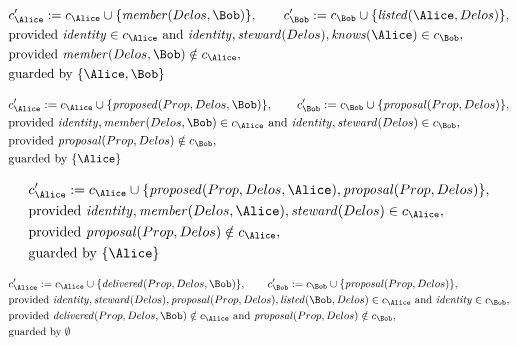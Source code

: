 \begin{align*}
&
c'_
{
\Alice
}
 := 
c_
{
\Alice
}
 \cup 
\{
\mathit{\detokenize{
member
}}
(
Delos
,
\Bob
)
\}
, \qquad 
c'_
{
\Bob
}
 := 
c_
{
\Bob
}
 \cup 
\{
\mathit{\detokenize{
listed
}}
(
\Alice
,
Delos
)
\}
,\\
&
\text{provided } 
\mathit{\detokenize{
identity
}}
 \in c_
{
\Alice
}
 \text{ and } 
\mathit{\detokenize{
identity
}}
,
\mathit{\detokenize{
steward
}}
(
Delos
)
,
\mathit{\detokenize{
knows
}}
(
\Alice
)
 \in c_
{
\Bob
}
,\\
&
\text{provided } 
\mathit{\detokenize{
member
}}
(
Delos
,
\Bob
)
 \notin c_
{
\Alice
}
,\\
&
\text{guarded by } \{
\Alice
,
\Bob
\}
\end{align*}

\begin{align*}
&
c'_
{
\Alice
}
 := 
c_
{
\Alice
}
 \cup 
\{
\mathit{\detokenize{
proposed
}}
(
Prop
,
Delos
,
\Bob
)
\}
, \qquad 
c'_
{
\Bob
}
 := 
c_
{
\Bob
}
 \cup 
\{
\mathit{\detokenize{
proposal
}}
(
Prop
,
Delos
)
\}
,\\
&
\text{provided } 
\mathit{\detokenize{
identity
}}
,
\mathit{\detokenize{
member
}}
(
Delos
,
\Bob
)
 \in c_
{
\Alice
}
 \text{ and } 
\mathit{\detokenize{
identity
}}
,
\mathit{\detokenize{
steward
}}
(
Delos
)
 \in c_
{
\Bob
}
,\\
&
\text{provided } 
\mathit{\detokenize{
proposal
}}
(
Prop
,
Delos
)
 \notin c_
{
\Bob
}
,\\
&
\text{guarded by } \{
\Alice
\}
\end{align*}

\begin{align*}
&
c'_
{
\Alice
}
 := 
c_
{
\Alice
}
 \cup 
\{
\mathit{\detokenize{
proposed
}}
(
Prop
,
Delos
,
\Alice
)
,
\mathit{\detokenize{
proposal
}}
(
Prop
,
Delos
)
\}
,\\
&
\text{provided } 
\mathit{\detokenize{
identity
}}
,
\mathit{\detokenize{
member
}}
(
Delos
,
\Alice
)
,
\mathit{\detokenize{
steward
}}
(
Delos
)
 \in c_
{
\Alice
}
,\\
&
\text{provided } 
\mathit{\detokenize{
proposal
}}
(
Prop
,
Delos
)
 \notin c_
{
\Alice
}
,\\
&
\text{guarded by } \{
\Alice
\}
\end{align*}

\begin{align*}
&
c'_
{
\Alice
}
 := 
c_
{
\Alice
}
 \cup 
\{
\mathit{\detokenize{
delivered
}}
(
Prop
,
Delos
,
\Bob
)
\}
, \qquad 
c'_
{
\Bob
}
 := 
c_
{
\Bob
}
 \cup 
\{
\mathit{\detokenize{
proposal
}}
(
Prop
,
Delos
)
\}
,\\
&
\text{provided } 
\mathit{\detokenize{
identity
}}
,
\mathit{\detokenize{
steward
}}
(
Delos
)
,
\mathit{\detokenize{
proposal
}}
(
Prop
,
Delos
)
,
\mathit{\detokenize{
listed
}}
(
\Bob
,
Delos
)
 \in c_
{
\Alice
}
 \text{ and } 
\mathit{\detokenize{
identity
}}
 \in c_
{
\Bob
}
,\\
&
\text{provided } 
\mathit{\detokenize{
delivered
}}
(
Prop
,
Delos
,
\Bob
)
 \notin c_
{
\Alice
}
 \text{ and } 
\mathit{\detokenize{
proposal
}}
(
Prop
,
Delos
)
 \notin c_
{
\Bob
}
,\\
&
\text{guarded by } \emptyset
\end{align*}
